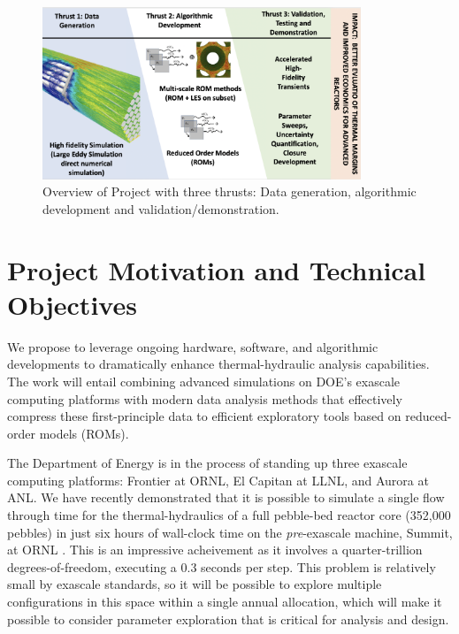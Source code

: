 \begin{figure}[h!]
    \centering
    \includegraphics[width = 0.85\textwidth]{figs/fig1.PNG}
    \caption{Overview of Project with three thrusts: Data generation, algorithmic development and validation/demonstration.}
    \label{f:01}
\end{figure}

\section{Project Motivation and Technical Objectives}

We propose to leverage ongoing hardware, software, and algorithmic developments
to dramatically enhance thermal-hydraulic analysis capabilities.  The work will
entail combining advanced simulations on DOE's exascale computing platforms
with modern data analysis methods that effectively compress these
first-principle data to efficient exploratory tools based on reduced-order
models (ROMs).

The Department of Energy is in the process of standing up three exascale
computing platforms: Frontier at ORNL, El Capitan at LLNL, and Aurora at ANL.
We have recently demonstrated that it is possible to simulate a single flow
through time for the thermal-hydraulics of a full pebble-bed reactor core
(352,000 pebbles) in just six hours of wall-clock time on the {\em
pre}-exascale machine, Summit, at ORNL \cite{sc22}.   This is an impressive
acheivement as it involves a quarter-trillion degrees-of-freedom, executing a
0.3 seconds per step.  This problem is relatively small by exascale standards,
so it will be possible to explore multiple configurations in this space within
a single annual allocation, which will make it possible to consider parameter
exploration that is critical for analysis and design.

